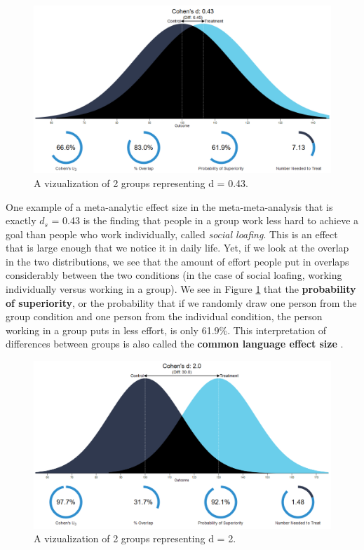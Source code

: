 \documentclass[
  oneside]{krantz}
\begin{document}
\begin{figure}

{\centering \includegraphics[width=1\linewidth]{images/rpsychd2} 

}

\caption{A vizualization of 2 groups representing d = 0.43.}\label{fig:rpsychd2}
\end{figure}

One example of a meta-analytic effect size in the meta-meta-analysis that is exactly \(d_s\) = 0.43 is the finding that people in a group work less hard to achieve a goal than people who work individually, called \emph{social loafing}. This is an effect that is large enough that we notice it in daily life. Yet, if we look at the overlap in the two distributions, we see that the amount of effort people put in overlaps considerably between the two conditions (in the case of social loafing, working individually versus working in a group). We see in Figure \ref{fig:rpsychd2} that the \textbf{probability of superiority}, or the probability that if we randomly draw one person from the group condition and one person from the individual condition, the person working in a group puts in less effort, is only 61.9\%. This interpretation of differences between groups is also called the \textbf{common language effect size} \citep{mcgraw_common_1992}.



\begin{figure}

{\centering \includegraphics[width=1\linewidth]{images/rpsychd3} 

}

\caption{A vizualization of 2 groups representing d = 2.}\label{fig:rpsychd3}
\end{figure}
\end{document}
